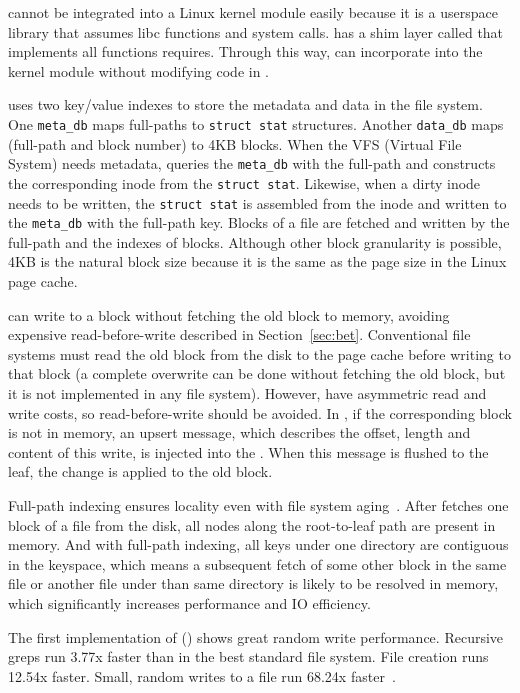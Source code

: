 \Fti cannot be integrated into a Linux kernel module easily because
it is a userspace library that assumes libc functions and system calls.
\betrfs has a shim layer called \klibc that implements all functions \fti
requires.
Through this way, \betrfs can incorporate \fti into the kernel module without
modifying code in \fti.

\betrfs uses two key/value indexes to store the metadata and data in the file
system.
One \texttt{meta\_db} maps full-paths to \texttt{struct stat} structures.
Another \texttt{data\_db} maps (full-path and block number) to 4KB blocks.
When the VFS (Virtual File System) needs metadata, \betrfs queries
the \texttt{meta\_db} with the full-path and constructs the corresponding inode
from the \texttt{struct stat}.
Likewise, when a dirty inode needs to be written, the \texttt{struct stat} is
assembled from the inode and written to the \texttt{meta\_db} with the
full-path key.
Blocks of a file are fetched and written by the full-path and the indexes of
blocks.
Although other block granularity is possible, 4KB is the natural block size
because it is the same as the page size in the Linux page cache.

\betrfs can write to a block without fetching the old block to memory, avoiding
expensive read-before-write described in Section~\ref{sec:bet}.
Conventional file systems must read the old block from the disk to the page
cache before writing to that block (a complete overwrite can be done without
fetching the old block, but it is not implemented in any file system).
However, \bets have asymmetric read and write costs, so read-before-write should
be avoided.
In \betrfs, if the corresponding block is not in memory, an upsert message,
which describes the offset, length and content of this write, is injected into
the \bet.
When this message is flushed to the leaf, the change is applied to the old
block.

Full-path indexing ensures locality even with file system aging~\citep{betrfs3}.
After \betrfs fetches one block of a file from the disk, all nodes along the
root-to-leaf path are present in memory.
And with full-path indexing, all keys under one directory are contiguous in the
keyspace, which means a subsequent fetch of some other block in the same file or
another file under than same directory is likely to be resolved in memory,
which significantly increases performance and IO efficiency.

The first implementation of \betrfs (\betrfsOne) shows great random write
performance.
Recursive greps run 3.77x faster than in the best standard file system.
File creation runs 12.54x faster.
Small, random writes to a file run 68.24x faster~\citep{betrfs1tos}.

